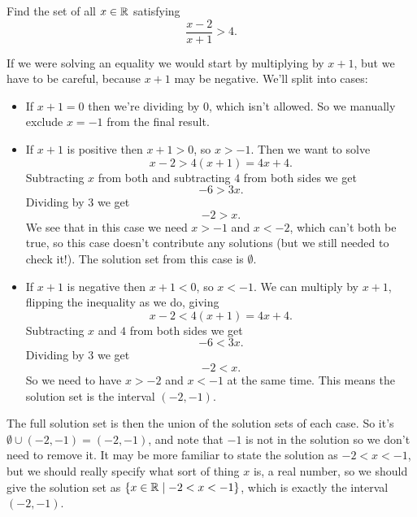 \documentclass[fleqn]{LectureClass/LectureClass}
\begin{document}
    \begin{exm}{}{}
        Find the set of all \(x \in \mathbb{R}\) satisfying
        \begin{equation}
            \frac{x - 2}{x + 1} > 4.
        \end{equation}
        
        If we were solving an equality we would start by multiplying by \(x + 1\), but we have to be careful, because \(x + 1\) may be negative.
        We'll split into cases:
        \begin{itemize}
            \item If \(x + 1 = 0\) then we're dividing by \(0\), which isn't allowed.
            So we manually exclude \(x = -1\) from the final result.
            \item If \(x + 1\) is positive then \(x + 1 > 0\), so \(x > -1\).
            Then we want to solve
            \begin{equation}
                x - 2 > 4(x + 1) = 4x + 4.
            \end{equation}
            Subtracting \(x\) from both and subtracting \(4\) from both sides we get
            \begin{equation}
                -6 > 3x.
            \end{equation}
            Dividing by \(3\) we get
            \begin{equation}
                -2 > x.
            \end{equation}
            We see that in this case we need \(x > -1\) and \(x < -2\), which can't both be true, so this case doesn't contribute any solutions (but we still needed to check it!).
            The solution set from this case is \(\emptyset\).
            \item If \(x + 1\) is negative then \(x + 1 < 0\), so \(x < -1\).
            We can multiply by \(x + 1\), flipping the inequality as we do, giving
            \begin{equation}
                x - 2 < 4(x + 1) = 4x + 4.
            \end{equation}
            Subtracting \(x\) and \(4\) from both sides we get
            \begin{equation}
                -6 < 3x.
            \end{equation}
            Dividing by \(3\) we get
            \begin{equation}
                -2 < x.
            \end{equation}
            So we need to have \(x > -2\) and \(x < -1\) at the same time.
            This means the solution set is the interval \((-2, -1)\).
        \end{itemize}
        The full solution set is then the union of the solution sets of each case.
        So it's \(\emptyset \cup (-2, -1) = (-2, -1)\), and note that \(-1\) is not in the solution so we don't need to remove it.
        It may be more familiar to state the solution as \(-2 < x < -1\), but we should really specify what sort of thing \(x\) is, a real number, so we should give the solution set as \(\{x \in \mathbb{R} \mid -2 < x < -1\}\), which is exactly the interval \((-2, -1)\).
        

\end{exm}
\end{document}
